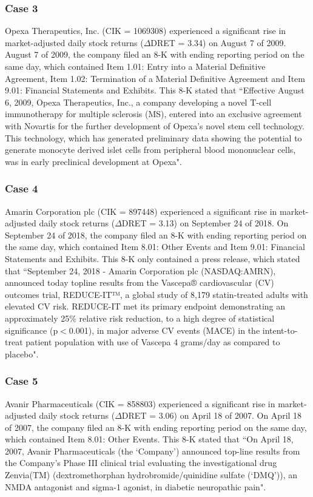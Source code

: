 \begin{small}
\subsubsection*{Case 3}
Opexa Therapeutics, Inc. (CIK = 1069308) experienced a significant rise in market-adjusted daily stock returns ($\Delta$DRET = 3.34) on August 7 of 2009. August 7 of 2009, the company filed an 8-K with ending reporting period on the same day, which contained Item 1.01: Entry into a Material Definitive Agreement, Item 1.02: Termination of a Material Definitive Agreement and Item 9.01: Financial Statements and Exhibits. This 8-K stated that ``Effective August 6, 2009, Opexa Therapeutics, Inc., a company developing a novel T-cell immunotherapy for multiple sclerosis (MS), entered into an exclusive agreement with Novartis for the further development of Opexa’s novel stem cell technology. This technology, which has generated preliminary data showing the potential to generate monocyte derived islet cells from peripheral blood mononuclear cells, was in early preclinical development at Opexa". 
\subsubsection*{Case 4}
Amarin Corporation plc (CIK = 897448) experienced a significant rise in market-adjusted daily stock returns ($\Delta$DRET = 3.13) on September 24 of 2018. On September 24 of 2018, the company filed an 8-K with ending reporting period on the same day, which contained Item 8.01: Other Events and Item 9.01: Financial Statements and Exhibits. This 8-K only contained a press release, which stated that ``September 24, 2018 - Amarin Corporation plc (NASDAQ:AMRN), announced today topline results from the Vascepa® cardiovascular (CV) outcomes trial, REDUCE-IT™, a global study of 8,179 statin-treated adults with elevated CV risk. REDUCE-IT met its primary endpoint demonstrating an approximately 25\% relative risk reduction, to a high degree of statistical significance (p$<$0.001), in major adverse CV events (MACE) in the intent-to-treat patient population with use of Vascepa 4 grams/day as compared to placebo".
\subsubsection*{Case 5}
Avanir Pharmaceuticals (CIK = 858803) experienced a significant rise in market-adjusted daily stock returns ($\Delta$DRET = 3.06) on April 18 of 2007. On April 18 of 2007, the company filed an 8-K with ending reporting period on the same day, which contained Item 8.01: Other Events. This 8-K stated that ``On April 18, 2007, Avanir Pharmaceuticals (the `Company') announced top-line results from the Company's Phase III clinical trial evaluating the investigational drug Zenvia(TM) (dextromethorphan hydrobromide/quinidine sulfate (`DMQ')), an NMDA antagonist and sigma-1 agonist, in diabetic neuropathic pain".


\end{small}
